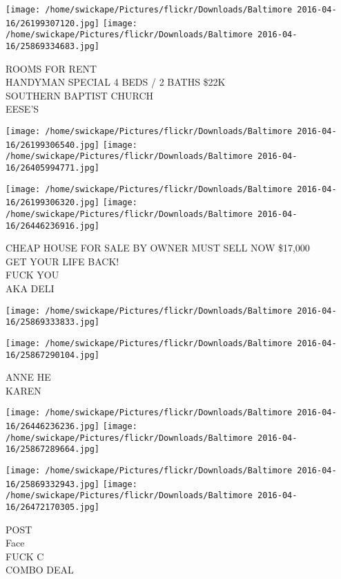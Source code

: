\documentclass[10pt,letterpaper]{article}
\begin{document}
\texttt{[image: /home/swickape/Pictures/flickr/Downloads/Baltimore 2016-04-16/26199307120.jpg]}
\texttt{[image: /home/swickape/Pictures/flickr/Downloads/Baltimore 2016-04-16/25869334683.jpg]}

ROOMS FOR RENT\\
HANDYMAN SPECIAL 4 BEDS / 2 BATHS \$22K\\
SOUTHERN BAPTIST CHURCH\\
EESE'S\\
\pagebreak

\texttt{[image: /home/swickape/Pictures/flickr/Downloads/Baltimore 2016-04-16/26199306540.jpg]}
\texttt{[image: /home/swickape/Pictures/flickr/Downloads/Baltimore 2016-04-16/26405994771.jpg]}

\texttt{[image: /home/swickape/Pictures/flickr/Downloads/Baltimore 2016-04-16/26199306320.jpg]}
\texttt{[image: /home/swickape/Pictures/flickr/Downloads/Baltimore 2016-04-16/26446236916.jpg]}

CHEAP HOUSE FOR SALE BY OWNER MUST SELL NOW \$17,000\\
GET YOUR LIFE BACK!\\
FUCK YOU\\
AKA DELI\\
\pagebreak

\texttt{[image: /home/swickape/Pictures/flickr/Downloads/Baltimore 2016-04-16/25869333833.jpg]}

\vspace{0.25in}
\texttt{[image: /home/swickape/Pictures/flickr/Downloads/Baltimore 2016-04-16/25867290104.jpg]}

ANNE HE\\
KAREN\\
\pagebreak

\texttt{[image: /home/swickape/Pictures/flickr/Downloads/Baltimore 2016-04-16/26446236236.jpg]}
\texttt{[image: /home/swickape/Pictures/flickr/Downloads/Baltimore 2016-04-16/25867289664.jpg]}

\texttt{[image: /home/swickape/Pictures/flickr/Downloads/Baltimore 2016-04-16/25869332943.jpg]}
\texttt{[image: /home/swickape/Pictures/flickr/Downloads/Baltimore 2016-04-16/26472170305.jpg]}

POST\\
Face\\
FUCK C\\
COMBO DEAL\\
\pagebreak
\end{document}
